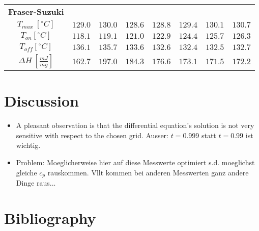 \documentclass{scrartcl}[12pt, halfparskip]
\numberwithin{equation}{section}
\numberwithin{figure}{section}
\numberwithin{table}{section}
\begin{document}
\begin{table}[H]
\begin{tabular}{| c | c | c | c | c | c | c | c |}
		
		\textbf{Fraser-Suzuki} & & & & & & & \\[0.7ex]
		$T_{max} \ [^{\circ}C]$ & $129.0$ & $130.0$ & $128.6$ & $128.8$ & $129.4$ & $130.1$ & $130.7$ \\[0.7ex]
		$T_{on} [^{\circ} C]$ & $118.1$ & $119.1$ & $121.0$ & $122.9$ & $124.4$ & $125.7$ & $126.3$ \\[0.7ex]
		$T_{off} [^{\circ} C]$ & $136.1$ & $135.7$ & $133.6$ & $132.6$ & $132.4$ & $132.5$ & $132.7$ \\[0.7ex]
		$\Delta H \ [\frac{mJ}{mg}]$ & $162.7$ & $197.0$ & $184.3$ & $176.6$ & $173.1$ & $171.5$ & $172.2$ \\ \hline
	\end{tabular}
	\caption{}
	\label{fig:eval_table_discussion}
\end{table}

\newpage
\section{Discussion}

\begin{itemize}
	\item A pleasant observation is that the differential equation's solution is not very sensitive with respect to the chosen grid.  Ausser: $t=0.999$ statt $t=0.99$ ist wichtig.
	\item Problem: Moeglicherweise hier auf diese Messwerte optimiert s.d. moeglichst gleiche $c_p$ rauskommen. Vllt kommen bei anderen Messwerten ganz andere Dinge raus...
\end{itemize}


\newpage
\section{Bibliography}
\end{document}
